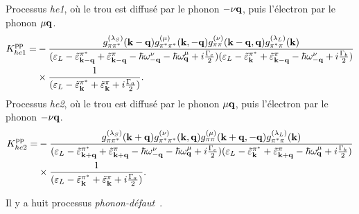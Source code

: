 Processus \textit{he1}, où le trou est diffusé par le phonon $-\nu\mathbf{q}$, puis l'électron par le phonon $\mu\mathbf{q}$.
\begin{equation}
    \begin{split}
    K_{he1}^{\text{pp}} = &-\frac{g^{(\lambda_S)}_{\pi\pi^*}(\mathbf{k}-\mathbf{q})g^{(\mu)}_{\pi^*\pi^*}(\mathbf{k},-\mathbf{q})g_{\pi\pi}^{(\nu)}(\mathbf{k}-\mathbf{q},\mathbf{q})g_{\pi^*\pi}^{(\lambda_L)}(\mathbf{k})}{(\varepsilon_L-\tilde{\varepsilon}_{\mathbf{k}-\mathbf{q}}^{\pi^*}+\tilde{\varepsilon}_{\mathbf{k}-\mathbf{q}}^\pi-\hbar\omega_{-\mathbf{q}}^\nu-\hbar\omega_{\mathbf{q}}^\mu+i\frac{\Gamma_c}{2})(\varepsilon_L-\tilde{\varepsilon}_{\mathbf{k}}^{\pi^*}+\tilde{\varepsilon}_{\mathbf{k}-\mathbf{q}}^\pi-\hbar\omega_{-\mathbf{q}}^\nu+i\frac{\Gamma_b}{2})}\\
    &\times\frac{1}{(\varepsilon_L-\tilde{\varepsilon}_{\mathbf{k}}^{\pi^*}+\tilde{\varepsilon}_{\mathbf{k}}^\pi+i\frac{\Gamma_a}{2})}.\label{eqn:pp_he1}
    \end{split}
\end{equation}
Processus \textit{he2}, où le trou est diffusé par le phonon $\mu\mathbf{q}$, puis l'électron par le phonon $-\nu\mathbf{q}$.
\begin{equation}
    \begin{split}
    K_{he2}^{\text{pp}} = &-\frac{g^{(\lambda_S)}_{\pi\pi^*}(\mathbf{k}+\mathbf{q})g^{(\nu)}_{\pi^*\pi^*}(\mathbf{k},\mathbf{q})g_{\pi\pi}^{(\mu)}(\mathbf{k}+\mathbf{q},-\mathbf{q})g_{\pi^*\pi}^{(\lambda_L)}(\mathbf{k})}{(\varepsilon_L-\tilde{\varepsilon}_{\mathbf{k}+\mathbf{q}}^{\pi^*}+\tilde{\varepsilon}_{\mathbf{k}+\mathbf{q}}^\pi-\hbar\omega_{-\mathbf{q}}^\nu-\hbar\omega_{\mathbf{q}}^\mu+i\frac{\Gamma_c}{2})(\varepsilon_L-\tilde{\varepsilon}_{\mathbf{k}}^{\pi^*}+\tilde{\varepsilon}_{\mathbf{k}+\mathbf{q}}^\pi-\hbar\omega_{\mathbf{q}}^\mu+i\frac{\Gamma_b}{2})}\\
    &\times\frac{1}{(\varepsilon_L-\tilde{\varepsilon}_{\mathbf{k}}^{\pi^*}+\tilde{\varepsilon}_{\mathbf{k}}^\pi+i\frac{\Gamma_a}{2})}.\label{eqn:pp_he2}
    \end{split}
\end{equation}

\clearpage
Il y a huit processus \textit{phonon-défaut}~\cite{venezuelaTheoryDoubleresonantRaman2011}.

